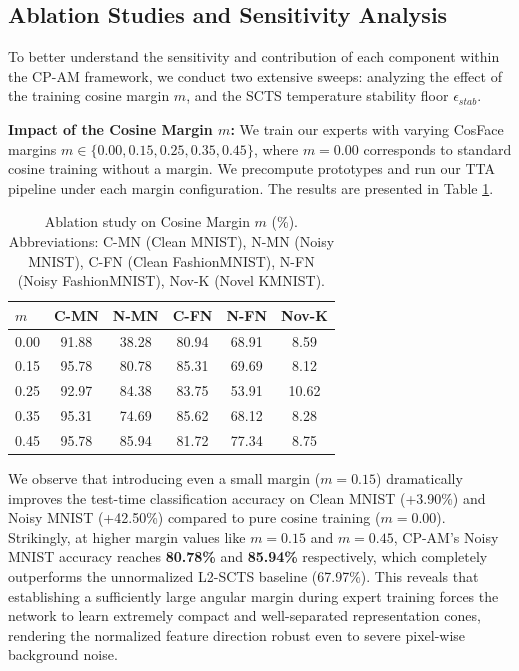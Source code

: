 \documentclass{article}
\theoremstyle{plain}
\theoremstyle{definition}
\theoremstyle{remark}
\begin{document}
\subsection{Ablation Studies and Sensitivity Analysis}
To better understand the sensitivity and contribution of each component within the CP-AM framework, we conduct two extensive sweeps: analyzing the effect of the training cosine margin $m$, and the SCTS temperature stability floor $\epsilon_{stab}$.

\textbf{Impact of the Cosine Margin $m$:} We train our experts with varying CosFace margins $m \in \{0.00, 0.15, 0.25, 0.35, 0.45\}$, where $m=0.00$ corresponds to standard cosine training without a margin. We precompute prototypes and run our TTA pipeline under each margin configuration. The results are presented in Table \ref{tab:margin_sweep}.

\begin{table}[h]
\caption{Ablation study on Cosine Margin $m$ (\%). Abbreviations: C-MN (Clean MNIST), N-MN (Noisy MNIST), C-FN (Clean FashionMNIST), N-FN (Noisy FashionMNIST), Nov-K (Novel KMNIST).}
\label{tab:margin_sweep}
\vskip 0.1in
\begin{center}
\begin{small}
\begin{sc}
\begin{tabular}{lccccc}
\toprule
$m$ & C-MN & N-MN & C-FN & N-FN & Nov-K \\
\midrule
0.00 & 91.88 & 38.28 & 80.94 & 68.91 & 8.59 \\
0.15 & 95.78 & 80.78 & 85.31 & 69.69 & 8.12 \\
0.25 & 92.97 & 84.38 & 83.75 & 53.91 & 10.62 \\
0.35 & 95.31 & 74.69 & 85.62 & 68.12 & 8.28 \\
0.45 & 95.78 & 85.94 & 81.72 & 77.34 & 8.75 \\
\bottomrule
\end{tabular}
\end{sc}
\end{small}
\end{center}
\vskip -0.1in
\end{table}

We observe that introducing even a small margin ($m=0.15$) dramatically improves the test-time classification accuracy on Clean MNIST (+3.90\%) and Noisy MNIST (+42.50\%) compared to pure cosine training ($m=0.00$). Strikingly, at higher margin values like $m=0.15$ and $m=0.45$, CP-AM's Noisy MNIST accuracy reaches \textbf{80.78\%} and \textbf{85.94\%} respectively, which completely outperforms the unnormalized L2-SCTS baseline (67.97\%). This reveals that establishing a sufficiently large angular margin during expert training forces the network to learn extremely compact and well-separated representation cones, rendering the normalized feature direction robust even to severe pixel-wise background noise.
\end{document}

